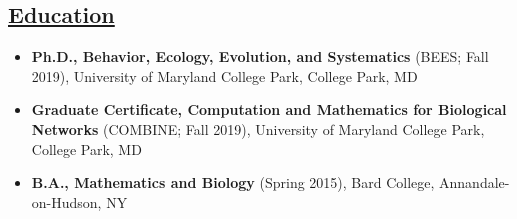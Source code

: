 \documentclass[]{res}
\begin{document}
\begin{resume}
\begin{itemize}[leftmargin=*]
\section{\underline{Education}} %

\begin{itemize}[leftmargin=*]
\setlength\itemsep{0.5em}
\item[] {\bf Ph.D., Behavior, Ecology, Evolution, and Systematics} (BEES; Fall 2019),
University of Maryland College Park, College Park, MD

\item[] {\bf Graduate Certificate, Computation and Mathematics for Biological Networks} (COMBINE; Fall 2019),
University of Maryland College Park, College Park, MD

\item[]  {\bf B.A., Mathematics and Biology}  (Spring 2015), Bard College, Annandale-on-Hudson, NY
\end{itemize}

 
 \end{itemize}
 

\end{resume}
\end{document}
